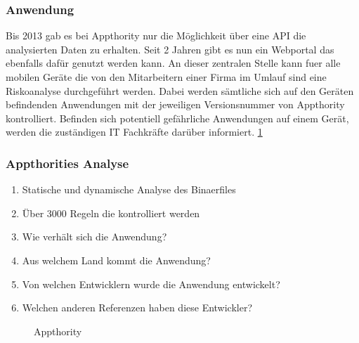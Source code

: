 \subsubsection{Anwendung}
Bis 2013 gab es bei Appthority nur die Möglichkeit über eine API die analysierten Daten zu erhalten. Seit 2 Jahren gibt es nun ein Webportal das ebenfalls dafür genutzt werden kann. An dieser zentralen Stelle kann fuer alle mobilen Geräte die von den Mitarbeitern einer Firma im Umlauf sind eine Riskoanalyse durchgeführt werden. Dabei werden sämtliche sich auf den Geräten befindenden Anwendungen mit der jeweiligen Versionsnummer von Appthority kontrolliert. Befinden sich potentiell gefährliche Anwendungen auf einem Gerät, werden die zuständigen IT Fachkräfte darüber informiert. \ref{fig:appthority} \cite{AppthorityBlog}\cite{Appthority}

\subsubsection{Appthorities Analyse}
\begin{enumerate}
\item Statische und dynamische Analyse des Binaerfiles 
\item Über 3000 Regeln die kontrolliert werden
\item Wie verhält sich die Anwendung?
\item Aus welchem Land kommt die Anwendung?
\item Von welchen Entwicklern wurde die Anwendung entwickelt?
\item Welchen anderen Referenzen haben diese Entwickler?
\end{enumerate}

\begin{figure}[h!]
  \centering
  \caption{Appthority}
  \label{fig:appthority}
\end{figure}

